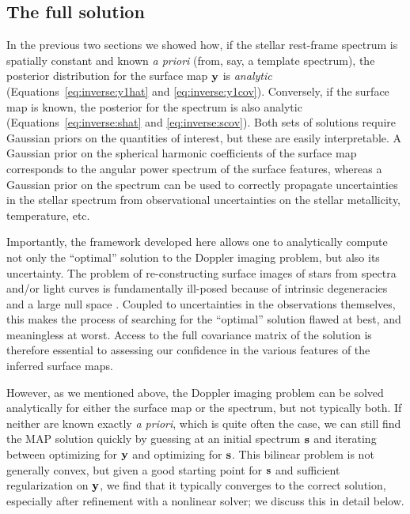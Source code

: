 \documentclass[modern]{aastex631}
\begin{document}
\subsection{The full solution}
\label{sec:full_solve}
%
In the previous two sections we showed how, if the stellar rest-frame spectrum is spatially constant and known \emph{a priori} (from, say, a template spectrum), the posterior distribution for the surface map ${\mathbf{y}}$ is \emph{analytic} (Equations~\ref{eq:inverse:y1hat} and \ref{eq:inverse:y1cov}). 
Conversely, if the surface map is known, the posterior for the spectrum is also analytic (Equations~\ref{eq:inverse:shat} and \ref{eq:inverse:scov}). 
Both sets of solutions require Gaussian priors on the quantities of interest, but these are easily interpretable. 
A Gaussian prior on the spherical harmonic coefficients of the surface map corresponds to the angular power spectrum of the surface features, whereas a Gaussian prior on the spectrum can be used to correctly propagate uncertainties in the stellar spectrum from observational uncertainties on the stellar metallicity, temperature, etc.

Importantly, the framework developed here allows one to analytically compute not only the ``optimal'' solution to the Doppler imaging problem, but also its uncertainty. 
The problem of re-constructing surface images of stars from spectra and/or light curves is fundamentally ill-posed because of intrinsic degeneracies and a large null space \citep[e.g.,][]{Cowan2017,Luger2019}. 
Coupled to uncertainties in the observations themselves, this makes the process of searching for the ``optimal'' solution flawed at best, and meaningless at worst. 
Access to the full covariance matrix of the solution is therefore essential to assessing our confidence in the various features of the inferred surface maps.

However, as we mentioned above, the Doppler imaging problem can be solved analytically for either the surface map or the spectrum, but not typically both. 
If neither are known exactly \emph{a priori}, which is quite often the case, we can still find the MAP solution quickly by guessing at an initial spectrum ${\mathbf{s}}$ and iterating between optimizing for ${\mathbf{y}}$ and optimizing for ${\mathbf{s}}$. 
This bilinear problem is not generally convex, but given a good starting point for ${\mathbf{s}}$ and sufficient regularization on ${\mathbf{y}}$, we find that it typically converges to the correct solution, especially after refinement with a nonlinear solver; we discuss this in detail below.
\end{document}
